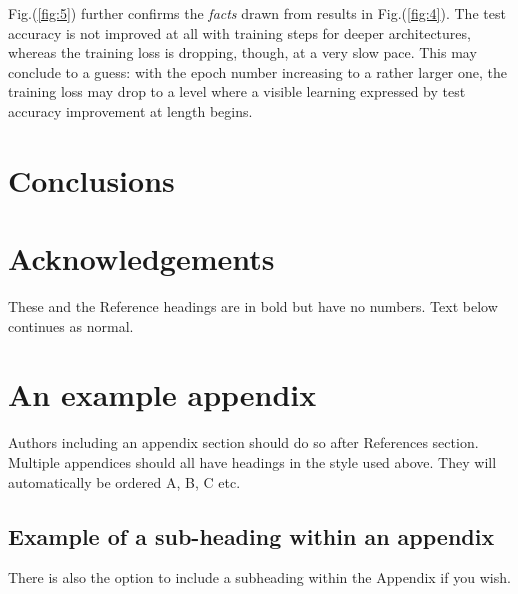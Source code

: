\documentclass[3p,times,procedia]{elsarticle}
\begin{document}
Fig.(\ref{fig:5}) further confirms the 
\emph{facts} 
drawn from results in Fig.(\ref{fig:4}).
The test accuracy is not improved at all
with training steps for deeper architectures,
whereas the training loss is dropping, though,
at a very slow pace. This may conclude to a guess:
with the epoch number increasing to a rather larger
one, the training loss may drop to a level where
a visible learning expressed by test accuracy 
improvement at length begins.



\section{Conclusions}


\section*{Acknowledgements}

These and the Reference headings are in bold but have no numbers. Text below continues as normal.
















\appendix
\section{An example appendix}
Authors including an appendix section should do so after References section. Multiple appendices should all have headings in the style used above. They will automatically be ordered A, B, C etc.

\subsection{Example of a sub-heading within an appendix}
There is also the option to include a subheading within the Appendix if you wish.
\end{document}
